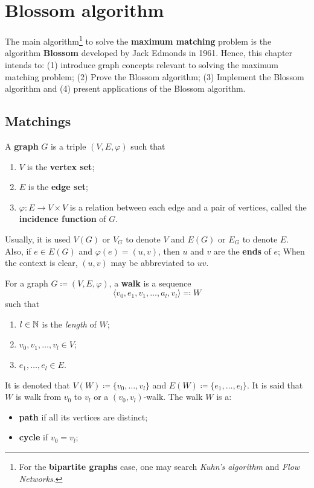 \chapter{Blossom algorithm}

The main algorithm\footnote{For the \textbf{bipartite graphs} case, one may search \textit{Kuhn's algorithm} and \textit{Flow Networks}.} to solve the \textbf{maximum matching} problem is the algorithm \textbf{Blossom} developed by Jack Edmonds in 1961.
Hence, this chapter intends to: 
(1) introduce graph concepts relevant to solving the maximum matching problem;
(2) Prove the Blossom algorithm; 
(3) Implement the Blossom algorithm and 
(4) present applications of the Blossom algorithm.

\enlargethispage{.5\baselineskip}

\section{Matchings}

\begin{definition}[Graph]
	\label{def:graph}
	A \textbf{graph} \(G\) is a triple \((V, E, \varphi)\) such that
	\begin{enumerate}[label=(\roman*)]
		\item \(V\) is the \textbf{vertex set};
		\item \(E\) is the \textbf{edge set};
		\item \(\varphi: E \to V \times V\) is a relation between each edge and a pair of vertices, called the \textbf{incidence function} of \(G\).
	\end{enumerate}
	Usually, it is used 
	\(V(G)\) or \(V_G\) to denote \(V\) and 
	\(E(G)\) or \(E_G\) to denote \(E\).
	Also, if \(e \in E(G)\) and \(\varphi(e) = (u, v)\), then \(u\) and \(v\) are the \textbf{ends} of \(e\);
	When the context is clear, \((u, v)\) may be abbreviated to \(uv\).
\end{definition}

\begin{definition}[Walk]
	\label{def:walk}
	For a graph \(G \coloneqq (V, E, \varphi)\), a \textbf{walk} is a sequence
	\[
		\langle v_0, e_1, v_1, \dots, a_l, v_l \rangle \eqqcolon W
	\]
	such that
	\begin{enumerate}[label=(\roman*)]
		\item \(l \in \mathbb{N}\) is the \textit{length} of \(W\);
		\item \(v_0, v_1, \dots, v_l \in V\);
		\item \(e_1, \dots, e_l \in E\).
	\end{enumerate}
	It is denoted that \(V(W) 
	\coloneqq \{v_0, \dots, v_l\}\) 
	and 
	\(E(W) \coloneqq \{e_1, \dots, e_l\}\). 
	It is said that \(W\) is walk from \(v_0\) to \(v_l\) or a \((v_0, v_l)\)-walk.
	The walk \(W\) is a:
	\begin{itemize}
		\item 
			\textbf{path} if all its vertices are distinct;
		\item 
			\textbf{cycle} if \(v_0 = v_l\);
	\end{itemize}
\end{definition}


